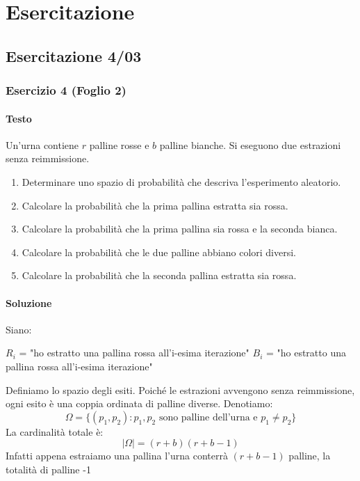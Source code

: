 % 
\chapter{Esercitazione}

\section{Esercitazione 4/03}
\subsection{Esercizio 4 (Foglio 2)}
\subsubsection{Testo}
Un’urna contiene \(r\) palline rosse e \(b\) palline bianche. Si eseguono due estrazioni senza reimmissione.
\begin{enumerate}[label=(\alph*)]
    \item Determinare uno spazio di probabilità che descriva l’esperimento aleatorio.
    \item Calcolare la probabilità che la prima pallina estratta sia rossa.
    \item Calcolare la probabilità che la prima pallina sia rossa e la seconda bianca.
    \item Calcolare la probabilità che le due palline abbiano colori diversi.
    \item Calcolare la probabilità che la seconda pallina estratta sia rossa.
\end{enumerate}

\subsubsection{Soluzione}
Siano:

$R_i$ = "ho estratto una pallina rossa all'i-esima iterazione"
$B_i$ = "ho estratto una pallina rossa all'i-esima iterazione"

Definiamo lo spazio degli esiti. Poiché le estrazioni avvengono senza reimmissione, ogni esito è una coppia ordinata di palline diverse. Denotiamo:
\[
    \Omega = \{ (p_1, p_2) : p_1, p_2 \text{ sono palline dell'urna e } p_1 \neq p_2 \}
\]
La cardinalità totale è:
\[
    |\Omega| = (r+b)(r+b-1)
\]
Infatti appena estraiamo una pallina l'urna conterrà $(r+b-1)$ palline, la totalità di palline -1


